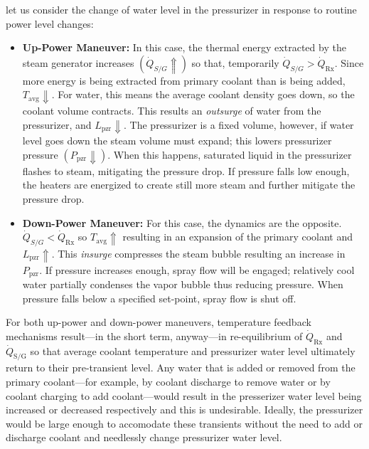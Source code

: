 let us consider the change of water level in the pressurizer in response to routine power level changes:
\begin{itemize}
\item \textbf{Up-Power Maneuver:} In this case, the thermal energy extracted by the steam generator increases $\left(\dot{Q}_{S/G} \Uparrow \right)$ so that, temporarily $\dot{Q}_{S/G} > \dot{Q}_{\text{Rx}}$.  Since more energy is being extracted from primary coolant than is being added, $T_{\text{avg}} \Downarrow$.  For water, this means the average coolant density goes down, so the coolant volume contracts.  This results an \emph{outsurge} of water from the pressurizer, and $L_{\text{pzr}} \Downarrow$.  The pressurizer is a fixed volume, however, if water level goes down the steam volume must expand; this lowers pressurizer pressure $\left(P_{\text{pzr}} \Downarrow \right)$.  When this happens, saturated liquid in the pressurizer flashes to steam, mitigating the pressure drop.  If pressure falls low enough, the heaters are energized to create still more steam and further mitigate the pressure drop.

\item \textbf{Down-Power Maneuver:} For this case, the dynamics are the opposite.  $\dot{Q}_{S/G} < \dot{Q}_{\text{Rx}}$ so $T_{\text{avg}} \Uparrow$ resulting in an expansion of the primary coolant and $L_{\text{pzr}} \Uparrow$.  This \emph{insurge} compresses the steam bubble resulting an increase in $P_{\text{pzr}}$.  If pressure increases enough, spray flow will be engaged; relatively cool water partially condenses the vapor bubble thus reducing pressure.  When pressure falls below a specified set-point, spray flow is shut off.
\end{itemize}

For both up-power and down-power maneuvers, temperature feedback mechanisms result---in the short term, anyway---in re-equilibrium of $\dot{Q}_{\text{Rx}}$ and $\dot{Q}_{\text{S/G}}$ so that average coolant temperature and pressurizer water level ultimately return to their pre-transient level.  Any water that is added or removed from the primary coolant---for example, by coolant discharge to remove water or by coolant charging to add coolant---would result in the presserizer water level being increased or decreased respectively and this is undesirable.  Ideally, the pressurizer would be large enough to accomodate these transients without the need to add or discharge coolant and needlessly change pressurizer water level.

